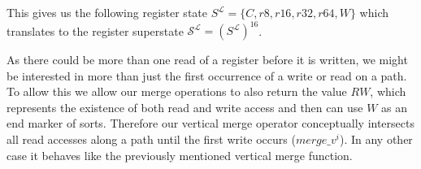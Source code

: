 This gives us the following register state $S^\mathcal{L} = \{ C, r8, r16, r32, r64, W \}$ which translates to the register superstate 
$\mathcal{S}^\mathcal{L} = (S^\mathcal{L})^{16}$.

As there could be more than one read of a register before it is written, we might be interested in more than just the first occurrence of a write or read on a path. 
To allow this we allow our merge operations to also return the value $RW$, which represents the existence of both read and write access and then can use $W$ as an end 
marker of sorts.
Therefore our vertical merge operator conceptually intersects all read accesses along a path until the first write 
occurs ($merge\_v^{i}$). In any other case it behaves like the previously mentioned vertical merge function.


